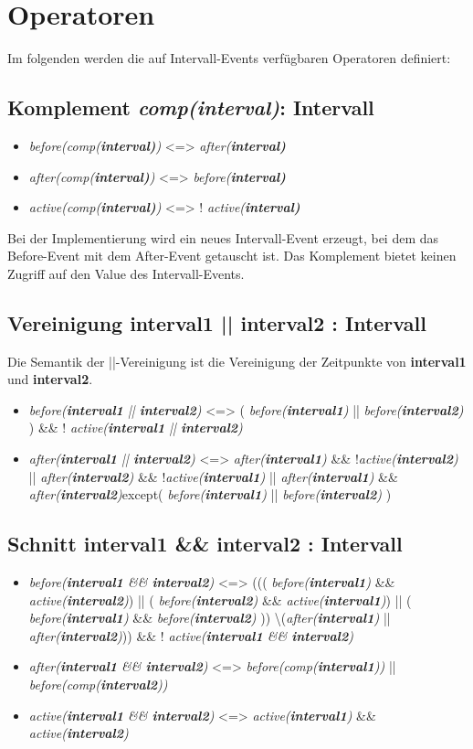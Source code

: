 \documentclass[article,colorback,accentcolor=tud4c]{tudreport}
\newcommand{\before}[1]{\textit{ before(#1) }}
\newcommand{\after}[1]{\textit{after(#1)}}
\newcommand{\aktiv}[1]{\textit{active(#1)}}
\newcommand{\Interval}[1]{\textbf{interval#1}}
\newcommand{\comp}[1]{\textit{comp(#1)}}
\begin{document}
\section{Operatoren}
Im folgenden werden die auf Intervall-Events verfügbaren Operatoren definiert:

\subsection{Komplement \comp\Interval : Intervall}
\begin{itemize}
\item \before{\comp{\Interval}} <=> \after{\Interval}
\item \after{\comp{\Interval}} <=> \before{\Interval} 
\item \aktiv{\comp{\Interval}} <=> ! \aktiv{\Interval}
\end{itemize}
Bei der Implementierung wird ein neues Intervall-Event erzeugt, bei dem das 
Before-Event mit dem After-Event getauscht ist. Das Komplement bietet keinen
Zugriff auf den Value des Intervall-Events.

\subsection{Vereinigung \Interval{1} || \Interval{2} : Intervall}
Die Semantik der ||-Vereinigung ist die Vereinigung der Zeitpunkte von
\Interval{1} und \Interval{2}.
\begin{itemize}
\item \before{\Interval{1} || \Interval{2}}  <=> (\before{\Interval{1}} ||
\before{\Interval{2}}) \&\& !
\aktiv{\Interval{1} || \Interval{2}}
\item \after{\Interval{1} || \Interval{2}} <=> \after{\Interval{1}} \&\&
!\aktiv{\Interval{2}} || \after{\Interval{2}} \&\& !\aktiv{\Interval{1}} ||
\after{\Interval{1}} \&\& \after{\Interval{2}}except(\before{\Interval{1}}||\before{\Interval{2}})

\end{itemize}

\subsection{Schnitt \Interval{1} \&\& \Interval{2} : Intervall}
\begin{itemize}
\item \before{\Interval{1} \&\& \Interval{2}} <=> (((\before{\Interval{1}} \&\& \aktiv{\Interval{2}}) ||
(\before{\Interval{2}} \&\& \aktiv{\Interval{1}}) || (\before{\Interval{1}} \&\& \before{\Interval{2}}))
\textbackslash (\after{\Interval{1}} || \after{\Interval{2}})) \&\& ! \aktiv{\Interval{1} \&\& \Interval{2}}
\item \after{\Interval{1} \&\& \Interval{2}} <=> \before{\comp{\Interval{1}}} ||
\before{\comp{\Interval{2}}}
\item \aktiv{\Interval{1} \&\& \Interval{2}} <=> \aktiv{\Interval{1}} \&\& \aktiv{\Interval{2}}
\end{itemize}
\end{document}
